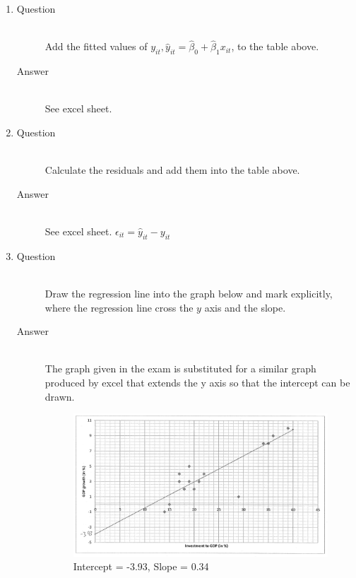 \documentclass{article}
\begin{document}
\begin{enumerate}
  \item
  \begin{description}
    \item[Question] \hfill \\
    Add the fitted values of $y_{it}, \hat{y}_{it} = \hat{\beta}_{0} + \hat{\beta}_{1}x_{it}$, to the table above.
    \item[Answer] \hfill \\
    See excel sheet.
  \end{description}
  
  \item
  \begin{description}
    \item[Question] \hfill \\
    Calculate the residuals and add them into the table above.
    \item[Answer] \hfill \\
    See excel sheet. $\epsilon_{it} = \hat{y}_{it} - y_{it}$
  \end{description}
  
  \item
  \begin{description}
    \item[Question] \hfill \\
    Draw the regression line into the graph below and mark explicitly, where the regression line cross the $y$ axis and the slope.
    \item[Answer] \hfill \\
    The graph given in the exam is substituted for a similar graph produced by excel that extends the y axis so that the intercept can be drawn.
    \begin{figure}
      \includegraphics[width=12cm]{../graph_scan-1.png}
      \caption{Intercept = -3.93, Slope = 0.34}
    \end{figure}
  \end{description}
  

\end{enumerate}
\end{document}
